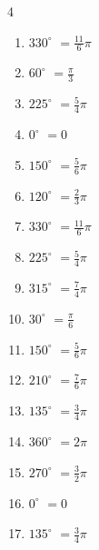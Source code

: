 \begin{multicols}{4}
\begin{enumerate}
  \item $\displaystyle 330^{\circ}$
        $\displaystyle =\frac{11}{6}\pi$

  \item $\displaystyle 60^{\circ}$
        $\displaystyle =\frac{\pi}{3}$

  \item $\displaystyle 225^{\circ}$
        $\displaystyle =\frac{5}{4}\pi$

  \item $\displaystyle 0^{\circ}$
        $\displaystyle =0$

  \item $\displaystyle 150^{\circ}$
        $\displaystyle =\frac{5}{6}\pi$

  \item $\displaystyle 120^{\circ}$
        $\displaystyle =\frac{2}{3}\pi$

  \item $\displaystyle 330^{\circ}$
        $\displaystyle =\frac{11}{6}\pi$

  \item $\displaystyle 225^{\circ}$
        $\displaystyle =\frac{5}{4}\pi$

  \item $\displaystyle 315^{\circ}$
        $\displaystyle =\frac{7}{4}\pi$

  \item $\displaystyle 30^{\circ}$
        $\displaystyle =\frac{\pi}{6}$

  \item $\displaystyle 150^{\circ}$
        $\displaystyle =\frac{5}{6}\pi$

  \item $\displaystyle 210^{\circ}$
        $\displaystyle =\frac{7}{6}\pi$

  \item $\displaystyle 135^{\circ}$
        $\displaystyle =\frac{3}{4}\pi$

  \item $\displaystyle 360^{\circ}$
        $\displaystyle =2\pi$

\columnbreak %

  \item $\displaystyle 270^{\circ}$
        $\displaystyle =\frac{3}{2}\pi$

  \item $\displaystyle 0^{\circ}$
        $\displaystyle =0$

  \item $\displaystyle 135^{\circ}$
        $\displaystyle =\frac{3}{4}\pi$


\end{enumerate}
\end{multicols}
